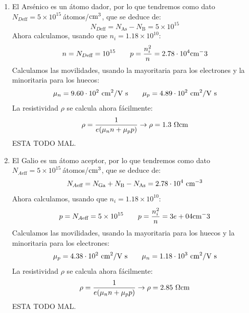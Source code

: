 \begin{texercise}
\begin{enumerate}[label=\alph*)]
		\item El Arsénico es un átomo dador, por lo que tendremos como dato $N_{D\text{eff}}=5 \times 10^{15} \ $átomos/$\text{cm}^3$, que se deduce de:
		\begin{equation}
			N_{D\text{eff}} = N_{\text{As}} - N_{\text{B}} = 5 \times 10^{15}
		\end{equation}
		Ahora calculamos, usando que $n_i=1.18\times 10^{10}$:   
		\begin{equation}
			n = N_{D\text{eff}} = 10^{15} \qquad p = \frac{n_i^2}{n} = 2.78 \cdot 10^4 \text{cm}^-3
		\end{equation}
		Calculamos las movilidades, usando la mayoritaria para los electrones y la minoritaria para los huecos:
		\begin{equation}
			\mu_n=9.60 \cdot 10^2  \ \cm^2 /  \text{V s} \qquad 
			\mu_p=4.89 \cdot 10^2  \ \cm^2 /  \text{V s}
		\end{equation}
		La resistividad $\rho$ se calcula ahora fácilmente:
		\begin{equation}
			\rho = \frac{1}{e(\mu_n n + \mu_pp)} \rightarrow \rho = 1.3 \ \Omega \text{cm}
		\end{equation}
		ESTA TODO MAL.
		\item El Galio es un átomo aceptor, por lo que tendremos como dato $N_{A\text{eff}}=5 \times 10^{15} \ $átomos/$\text{cm}^3$, que se deduce de:
		\begin{equation}
			N_{A\text{eff}} = N_{\text{Ga}} + N_{\text{B}} - N_{\text{As}} =  2.78 \cdot 10^4 \ \text{cm}^{-3}
		\end{equation}
		Ahora calculamos, usando que $n_i=1.18\times 10^{10}$:   
		\begin{equation}
			p = N_{A\text{eff}} = 5 \times 10^{15} \qquad p = \frac{n_i^2}{n} = 3e+04 \text{cm}^-3
		\end{equation}
		Calculamos las movilidades, usando la mayoritaria para los huecos y la minoritaria para los electrones:
		\begin{equation}
			\mu_p=4.38 \cdot 10^{2}  \ \cm^2 /  \text{V s} \qquad 
			\mu_n=1.18 \cdot 10^{3} \ \cm^2 /  \text{V s}
		\end{equation}
		La resistividad $\rho$ se calcula ahora fácilmente:
		\begin{equation}
			\rho = \frac{1}{e(\mu_n n + \mu_pp)} \rightarrow 
			\rho = 2.85 \ \Omega \text{cm}
		\end{equation}
		ESTA TODO MAL.
	\end{enumerate}
\end{texercise}

